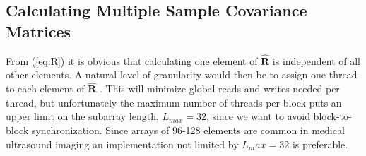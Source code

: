 \documentclass[12pt,journal,onecolumn]{IEEEtran}
\newcommand{\mat}[1]{\mathbf{#1}}
\begin{document}


\subsection{Calculating Multiple Sample Covariance Matrices}\label{sec:calcR}


From (\ref{eq:R}) it is obvious that calculating one element of $\mat{\hat{R}}$ is independent of all other elements. A natural level of granularity would then be to assign one thread to each element of $\mat{\hat{R}}$ \cite{Chen2011}. This will minimize global reads and writes needed per thread, but unfortunately the maximum number of threads per block puts an upper limit on the subarray length, $L_{max}=32$, since we want to avoid block-to-block synchronization. Since arrays of 96-128 elements are common in medical ultrasound imaging an implementation not limited by $L_max=32$ is preferable. 
\end{document}
